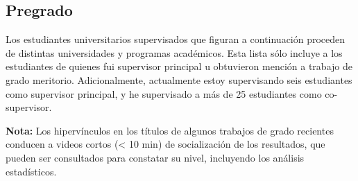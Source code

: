 \documentclass[11pt,a4paper,]{awesome-cv}
\begin{document}
\hypertarget{section-1}{%
\subsection{\texorpdfstring{\textbf{Pregrado}}{}}\label{section-1}}

\begin{footnotesize}
Los estudiantes universitarios supervisados que figuran a continuación proceden de distintas universidades y programas académicos. Esta lista sólo incluye a los estudiantes de quienes fui supervisor principal u obtuvieron mención a trabajo de grado meritorio. Adicionalmente, actualmente estoy supervisando seis estudiantes como supervisor principal, y he supervisado a más de 25 estudiantes como co-supervisor.

\textbf{Nota:} Los hipervínculos en los títulos de algunos trabajos de grado recientes conducen a videos cortos (< 10 min) de socialización de los resultados, que pueden ser consultados para constatar su nivel, incluyendo los análisis estadísticos.
\end{footnotesize}
\end{document}
